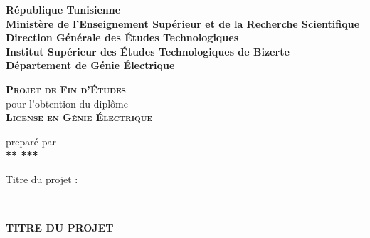 \begin{titlepage}
    \newcommand{\HRule}{\rule{\linewidth}{0.35mm}}
    \begin{flushleft}
        {\scriptsize
            \textbf{\large{République Tunisienne}}\\
            \textbf{\large{Ministère de l'Enseignement Supérieur et de la Recherche Scientifique}}\\
            \textbf{\large{Direction Générale des \'Etudes Technologiques}}\\
            \textbf{\large{Institut Supérieur des \'Etudes Technologiques de Bizerte}}\\
            \textbf{\large{Département de Génie \'Electrique}}}
    \end{flushleft}
    \begin{center}
        \textbf{\textsc{\huge{Projet de Fin d'\'Etudes}}}\\
        pour l'obtention du diplôme\\
        \textbf{\textsc{\large{License en Génie \'Electrique}}}\\
    \end{center}
    \begin{center}
        preparé par\\
        \textbf{{\large *** \textsc{***}}}\\
    \end{center}
    \begin{center}
        Titre du projet :\\
        \HRule \\[0.3cm]
        \Huge{\textbf{TITRE DU PROJET}}\\[0.2cm]

\end{center}
\end{titlepage}
